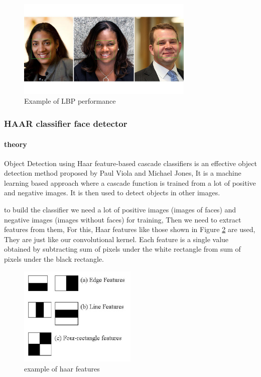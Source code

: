 \begin{figure}
	\centering
	\includegraphics[width=0.75\textwidth]{images/lbp_example.jpg}
	\caption{Example of LBP performance}
	\label{fig:LBP_example}
\end{figure}


\subsubsection{HAAR classifier face detector}

\paragraph{theory}
Object Detection using Haar feature-based cascade classifiers is an effective object detection method proposed by Paul Viola and Michael Jones\cite{haar}, It is a machine learning based approach where a cascade function is trained from a lot of positive and negative images. It is then used to detect objects in other images.

to build the classifier we need a lot of positive images (images of faces) and negative images (images without faces) for training, Then we need to extract features from them, For this, Haar features like those shown in Figure \ref{fig:haar_features} are used, They are just like our convolutional kernel. Each feature is a single value obtained by subtracting sum of pixels under the white rectangle from sum of pixels under the black rectangle.

\begin{figure}
	\centering
	\includegraphics[width=0.5\textwidth]{images/haar_features.jpg}
	\caption{example of haar features}
	\label{fig:haar_features}
\end{figure}

